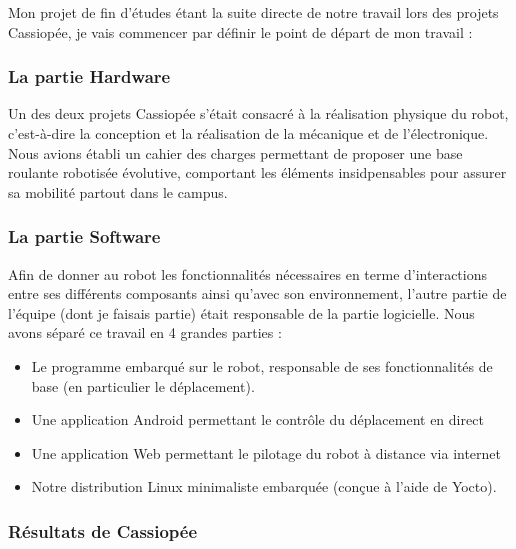 \documentclass{report}
\begin{document}
    {Mon projet de fin d'études étant la suite directe de notre travail lors des
     projets Cassiopée, je vais commencer par définir le point de départ de mon travail :}

     \subsubsection{La partie Hardware}

     {Un des deux projets Cassiopée s'était consacré à la réalisation physique
     du robot, c'est-à-dire la conception et la réalisation de la mécanique et
     de l'électronique. Nous avions établi un cahier des charges permettant de
    proposer une base roulante robotisée évolutive, comportant les éléments
    insidpensables pour assurer sa mobilité partout dans le campus.}

    \subsubsection{La partie Software}

    {Afin de donner au robot les fonctionnalités nécessaires en terme d'interactions
    entre ses différents composants ainsi qu'avec son environnement, l'autre partie
    de l'équipe (dont je faisais partie) était responsable de la partie logicielle.
    Nous avons séparé ce travail en 4 grandes parties :}
    \begin{itemize}
      \item Le programme embarqué sur le robot, responsable de ses
      fonctionnalités de base (en particulier le déplacement).
      \item Une application Android permettant le contrôle du déplacement en direct
      \item Une application Web permettant le pilotage du robot à distance via internet
      \item Notre distribution Linux minimaliste embarquée (conçue à l'aide de Yocto).
      \newline
    \end{itemize}

    \subsubsection{Résultats de Cassiopée}
\end{document}
